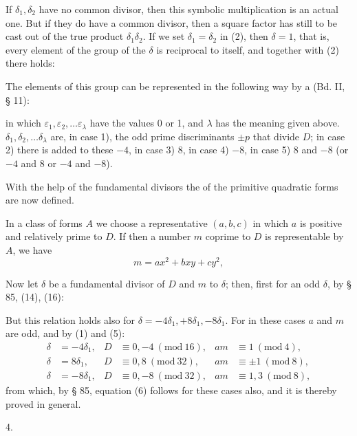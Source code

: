 
If $\delta_1, \delta_2$ have no common divisor, then this symbolic
multiplication is an actual one. But if they do have a common
divisor, then a square factor has still to be cast out of the true
product $\delta_1\delta_2$. If we set $\delta_1 = \delta_2$ in (2),
then $\delta = 1$, that is, every element of the group of the
$\delta$ is reciprocal to itself, and together with (2) there holds:


The elements of this group can be represented in the following way by a
 (Bd. II, § 11):


in which $\varepsilon_1, \varepsilon_2, \dots \varepsilon_\lambda$ have the values 0 or 1, and $\lambda$ has the
meaning given above. $\delta_1, \delta_2, \dots \delta_\lambda$ are, in case 1), the odd
prime discriminants $\pm p$ that divide $D$; in case 2) there
is added to these $-4$, in case 3) $8$, in case 4) $-8$, in
case 5) $8$ and $-8$ (or $-4$ and $8$ or $-4$ and $-8$).

With the help of the fundamental divisors the  of the
primitive quadratic forms are now defined.

In a class of forms $A$ we choose a representative
$(a,b,c)$ in which $a$ is positive and relatively prime to $D$. If then a
number $m$ coprime to $D$ is representable by $A$, we have
\[
m = ax^2 + bxy + cy^2,
\]

Now let $\delta$ be a fundamental divisor of $D$ and $m$ 
to $\delta$; then, first for an odd $\delta$, by § 85, (14), (16):


But this relation holds also for $\delta = -4\delta_1, +8\delta_1, -8\delta_1$.
For in these cases $a$ and $m$ are odd, and by (1)
and (5):
\[
\begin{aligned}
\delta &= -4\delta_1, & D &\equiv 0, -4 \ (\mathrm{mod}\ 16), & am &\equiv 1 \ (\mathrm{mod}\ 4), \\
\delta &= 8\delta_1, & D &\equiv 0, 8 \ (\mathrm{mod}\ 32), & am &\equiv \pm 1 \ (\mathrm{mod}\ 8), \\
\delta &= -8\delta_1, & D &\equiv 0, -8 \ (\mathrm{mod}\ 32), & am &\equiv 1, 3 \ (\mathrm{mod}\ 8),
\end{aligned}
\]
from which, by § 85, equation (6) follows for these cases also,
and it is thereby proved in general.

4. 
